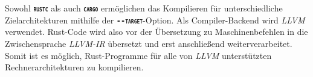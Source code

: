 Sowohl \texttt{\textsc{\textbf{rustc}}} als auch \texttt{\textsc{\textbf{cargo}}} ermöglichen das Kompilieren für
unterschiedliche Zielarchitekturen mithilfe der
\texttt{\textsc{\textbf{-{}-target}}}-Option. Als Compiler-Backend wird \textit{LLVM} verwendet.
Rust-Code wird also vor der Übersetzung zu Maschinenbefehlen in die Zwischensprache
\textit{LLVM-IR} übersetzt und erst anschließend weiterverarbeitet.
Somit ist es möglich, Rust-Programme für alle von \textit{LLVM}
unterstützten Rechnerarchitekturen zu kompilieren.\cite{rustGPU}











